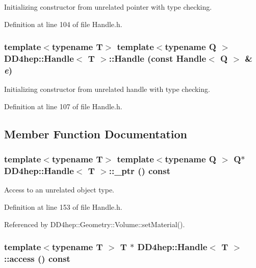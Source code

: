 Initializing constructor from unrelated pointer with type checking. 

Definition at line 104 of file Handle.h.\hypertarget{class_d_d4hep_1_1_handle_a992ea44be93dc5e115007c052b0044f8}{
\subsubsection[{Handle}]{\setlength{\rightskip}{0pt plus 5cm}template$<$typename T$>$ template$<$typename Q $>$ {\bf DD4hep::Handle}$<$ {\bf T} $>$::{\bf Handle} (const {\bf Handle}$<$ Q $>$ \& {\em e})}}
\label{class_d_d4hep_1_1_handle_a992ea44be93dc5e115007c052b0044f8}


Initializing constructor from unrelated handle with type checking. 

Definition at line 107 of file Handle.h.

\subsection{Member Function Documentation}
\hypertarget{class_d_d4hep_1_1_handle_a72866c3c06a9e008cc390b7a1ef859e7}{
\subsubsection[{\_\-ptr}]{\setlength{\rightskip}{0pt plus 5cm}template$<$typename T$>$ template$<$typename Q $>$ Q$\ast$ {\bf DD4hep::Handle}$<$ {\bf T} $>$::\_\-ptr () const}}
\label{class_d_d4hep_1_1_handle_a72866c3c06a9e008cc390b7a1ef859e7}


Access to an unrelated object type. 

Definition at line 153 of file Handle.h.

Referenced by DD4hep::Geometry::Volume::setMaterial().\hypertarget{class_d_d4hep_1_1_handle_a1a5500d3bf236420d8ba63979aff8599}{
\subsubsection[{access}]{\setlength{\rightskip}{0pt plus 5cm}template$<$typename T $>$ {\bf T} $\ast$ {\bf DD4hep::Handle}$<$ {\bf T} $>$::access () const}}
\label{class_d_d4hep_1_1_handle_a1a5500d3bf236420d8ba63979aff8599}



